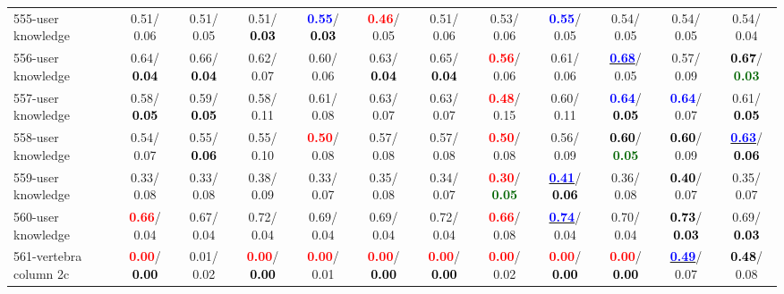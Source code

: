 \begin{table}[h]
\begin{center}
{\begin{tabular}{lc|c|c|c|c|c|c|c|c|c|c}
555-user knowledge &   0.51/  0.06 &   0.51/  0.05 &   0.51/\textcolor{black}{\textbf{  0.03}} & \textcolor{blue}{\textbf{  0.55}}/\textcolor{black}{\textbf{  0.03}} & \textcolor{red}{\textbf{  0.46}}/  0.05 &   0.51/  0.06 &   0.53/  0.06 & \textcolor{blue}{\textbf{  0.55}}/  0.05 &   0.54/  0.05 &   0.54/  0.05 &   0.54/  0.04 \\
556-user knowledge &   0.64/\textcolor{black}{\textbf{  0.04}} &   0.66/\textcolor{black}{\textbf{  0.04}} &   0.62/  0.07 &   0.60/  0.06 &   0.63/\textcolor{black}{\textbf{  0.04}} &   0.65/\textcolor{black}{\textbf{  0.04}} & \textcolor{red}{\textbf{  0.56}}/  0.06 &   0.61/  0.06 & \underline{\textcolor{blue}{\textbf{  0.68}}}/  0.05 &   0.57/  0.09 & \textcolor{black}{\textbf{  0.67}}/\textcolor{darkgreen}{\textbf{  0.03}} \\
557-user knowledge &   0.58/\textcolor{black}{\textbf{  0.05}} &   0.59/\textcolor{black}{\textbf{  0.05}} &   0.58/  0.11 &   0.61/  0.08 &   0.63/  0.07 &   0.63/  0.07 & \textcolor{red}{\textbf{  0.48}}/  0.15 &   0.60/  0.11 & \textcolor{blue}{\textbf{  0.64}}/\textcolor{black}{\textbf{  0.05}} & \textcolor{blue}{\textbf{  0.64}}/  0.07 &   0.61/\textcolor{black}{\textbf{  0.05}} \\
558-user knowledge &   0.54/  0.07 &   0.55/\textcolor{black}{\textbf{  0.06}} &   0.55/  0.10 & \textcolor{red}{\textbf{  0.50}}/  0.08 &   0.57/  0.08 &   0.57/  0.08 & \textcolor{red}{\textbf{  0.50}}/  0.08 &   0.56/  0.09 & \textcolor{black}{\textbf{  0.60}}/\textcolor{darkgreen}{\textbf{  0.05}} & \textcolor{black}{\textbf{  0.60}}/  0.09 & \underline{\textcolor{blue}{\textbf{  0.63}}}/\textcolor{black}{\textbf{  0.06}} \\ \hline
559-user knowledge &   0.33/  0.08 &   0.33/  0.08 &   0.38/  0.09 &   0.33/  0.07 &   0.35/  0.08 &   0.34/  0.07 & \textcolor{red}{\textbf{  0.30}}/\textcolor{darkgreen}{\textbf{  0.05}} & \underline{\textcolor{blue}{\textbf{  0.41}}}/\textcolor{black}{\textbf{  0.06}} &   0.36/  0.08 & \textcolor{black}{\textbf{  0.40}}/  0.07 &   0.35/  0.07 \\
560-user knowledge & \textcolor{red}{\textbf{  0.66}}/  0.04 &   0.67/  0.04 &   0.72/  0.04 &   0.69/  0.04 &   0.69/  0.04 &   0.72/  0.04 & \textcolor{red}{\textbf{  0.66}}/  0.08 & \underline{\textcolor{blue}{\textbf{  0.74}}}/  0.04 &   0.70/  0.04 & \textcolor{black}{\textbf{  0.73}}/\textcolor{black}{\textbf{  0.03}} &   0.69/\textcolor{black}{\textbf{  0.03}} \\
561-vertebra column 2c & \textcolor{red}{\textbf{  0.00}}/\textcolor{black}{\textbf{  0.00}} &   0.01/  0.02 & \textcolor{red}{\textbf{  0.00}}/\textcolor{black}{\textbf{  0.00}} & \textcolor{red}{\textbf{  0.00}}/  0.01 & \textcolor{red}{\textbf{  0.00}}/\textcolor{black}{\textbf{  0.00}} & \textcolor{red}{\textbf{  0.00}}/\textcolor{black}{\textbf{  0.00}} & \textcolor{red}{\textbf{  0.00}}/  0.02 & \textcolor{red}{\textbf{  0.00}}/\textcolor{black}{\textbf{  0.00}} & \textcolor{red}{\textbf{  0.00}}/\textcolor{black}{\textbf{  0.00}} & \underline{\textcolor{blue}{\textbf{  0.49}}}/  0.07 & \textcolor{black}{\textbf{  0.48}}/  0.08 \\

\end{tabular}}
\end{center}
\end{table}
